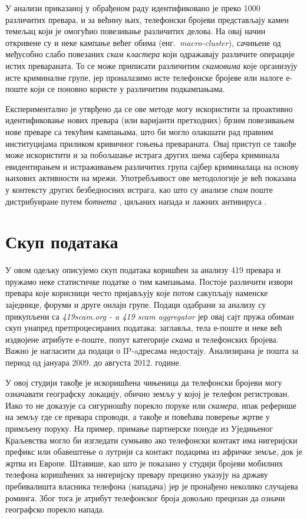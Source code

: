 \documentclass[a4paper]{article}
\begin{document}
У анализи приказаној у обрађеном раду \cite{article} идентификовано је преко 1000 различитих превара, и за већину њих, телефонски бројеви представљају камен темељац који је омогућио повезивање различитих делова. На овај начин откривене су и неке кампање већег обима (енг.~{\em macro-cluster}), сачињене од међусобно слабо повезаних \emph{скам кластера} који одражавају различите операције истих превараната. То се може приписати различитим \emph{скамовима} које организују исте криминалне групе, јер проналазимо исте телефонске бројеве или налоге е-поште који се поновно користе у различитим подкампањама.

Експериментално је утврђено да се ове методе могу искористити за проактивно идентификовање нових превара (или варијанти претходних) брзим повезивањем нове преваре са текућим кампањама, што би могло олакшати рад правним институцијама приликом кривичног гоњења превараната. Овај приступ се такође може искористити и за побољшање истрага других шема сајбера криминала евидентирањем и истраживањем различитих група сајбер криминалаца на основу њихових активности на мрежи. Употребљивост ове методологије је већ показана у контексту других безбедносних истрага, као што су анализе \emph{спам} поште дистрибуиране путем \emph{ботнета} \cite{botnet}, циљаних напада \cite{target} и лажних антивируса \cite{rogueav}.


\section{Скуп података}
У овом одељку описујемо скуп података коришћен за анализу 419 превара и пружамо неке статистичке податке о тим кампањама. Постоје различити извори превара које корисници често пријављују које потом сакупљају наменске заједнице, форуми и друге онлајн групе. Подаци одабрани за анализу су прикупљени са \emph{419scam.org - a 419 scam aggregator} јер овај сајт пружа обиман скуп унапред претпроцесираних података: заглавља, тела е-поште и неке већ издвојене атрибуте е-поште, попут категорије \emph{скама} и телефонских бројева. Важно је нагласити да подаци о IP-aдресама недостају. Анализирана је пошта за период од јануара 2009. до августа 2012. године.

У овој студији такође је искоришћена чињеница да телефонски бројеви могу означавати географску локацију, обично земљу у којој је телефон регистрован. Иако то не доказује са сигурношћу порекло поруке или \emph{скамера}, ипак реферише на земљу где се превара спроводи, а такође и повећава поверење жртве у примљену поруку. На пример, примање партнерске понуде из Уједињеног Краљевства могло би изгледати сумњиво ако телефонски контакт има нигеријски префикс или обавештење о лутрији са контакт подацима из афричке земље, док је жртва из Европе. Штавише, као што је показано у студији \cite{phone} бројеви мобилних телефона коришћених за нигеријску превару прецизно указују на државу пребивалишта власника телефона (нападача) јер је пронађено неколико случајева роминга. Због тога је атрибут телефонског броја довољно прецизан да означи географско порекло напада.
\end{document}
